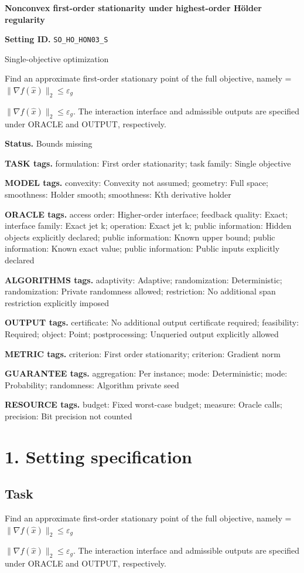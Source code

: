 \documentclass[10pt,a4paper]{article}
\newcommand{\AtlasMath}[1]{\par\begingroup\centering\setbox0=\hbox{$\displaystyle #1$}\ifdim\wd0>1.4\linewidth\typeout{ATLAS WIDE FORMULA: \the\wd0}\fi\ifdim\wd0>\linewidth\resizebox{\linewidth}{!}{\box0}\else\box0\fi\par\endgroup}
\newcommand{\AtlasInlineMath}[1]{\begingroup\setbox0=\hbox{$#1$}\ifdim\wd0>.4\linewidth\endgroup\AtlasMath{#1}\else\endgroup$#1$\fi}
\begin{document}
\raggedright

{\LARGE\bfseries\sffamily\color{AtlasNavy} Nonconvex first-order stationarity under highest-order Hölder regularity\par}\vspace{5pt}
\textbf{Setting ID.} \texttt{SO\_\allowbreak{}HO\_\allowbreak{}HON03\_\allowbreak{}S}

Single-objective optimization

Find an approximate first-order stationary point of the full objective, namely \AtlasInlineMath{\|\nabla f(\widehat{x})\|_2\le\varepsilon_g}. The interaction interface and admissible outputs are specified under ORACLE and OUTPUT, respectively.

\textbf{Status.} Bounds missing

\textbf{TASK tags.} formulation: First order stationarity; task family: Single objective

\textbf{MODEL tags.} convexity: Convexity not assumed; geometry: Full space; smoothness: Holder smooth; smoothness: Kth derivative holder

\textbf{ORACLE tags.} access order: Higher-order interface; feedback quality: Exact; interface family: Exact jet k; operation: Exact jet k; public information: Hidden objects explicitly declared; public information: Known upper bound; public information: Known exact value; public information: Public inputs explicitly declared

\textbf{ALGORITHMS tags.} adaptivity: Adaptive; randomization: Deterministic; randomization: Private randomness allowed; restriction: No additional span restriction explicitly imposed

\textbf{OUTPUT tags.} certificate: No additional output certificate required; feasibility: Required; object: Point; postprocessing: Unqueried output explicitly allowed

\textbf{METRIC tags.} criterion: First order stationarity; criterion: Gradient norm

\textbf{GUARANTEE tags.} aggregation: Per instance; mode: Deterministic; mode: Probability; randomness: Algorithm private seed

\textbf{RESOURCE tags.} budget: Fixed worst-case budget; measure: Oracle calls; precision: Bit precision not counted

\section{1. Setting specification}
\subsection{Task}
Find an approximate first-order stationary point of the full objective, namely \AtlasInlineMath{\|\nabla f(\widehat{x})\|_2\le\varepsilon_g}. The interaction interface and admissible outputs are specified under ORACLE and OUTPUT, respectively.
\end{document}
